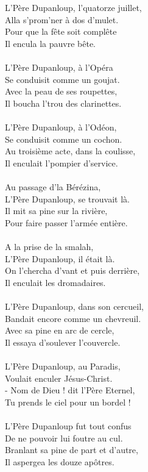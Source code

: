 \\\\L'Père Dupanloup, l'quatorze juillet, \bissimple
\\Alla s'prom'ner à dos d'mulet. \bissimple
\\Pour que la fête soit complête
\\Il encula la pauvre bête.
\\\\L'Père Dupanloup, à l'Opéra \bissimple
\\Se conduisit comme un goujat. \bissimple
\\Avec la peau de ses roupettes,
\\Il boucha l'trou des clarinettes.
\\\\L'Père Dupanloup, à l'Odéon, \bissimple
\\Se conduisit comme un cochon. \bissimple
\\Au troisième acte, dans la coulisse,
\\Il enculait l'pompier d'service.
\\\\Au passage d'la Bérézina, \bissimple
\\L'Père Dupanloup, se trouvait là. \bissimple
\\Il mit sa pine sur la rivière,
\\Pour faire passer l'armée entière.
\\\\A la prise de la smalah, \bissimple
\\L'Père Dupanloup, il était là. \bissimple
\\On l'chercha d'vant et puis derrière,
\\Il enculait les dromadaires.
\\\\L'Père Dupanloup, dans son cercueil, \bissimple
\\Bandait encore comme un chevreuil. \bissimple
\\Avec sa pine en arc de cercle,
\\Il essaya d'soulever l'couvercle.
\\\\L'Père Dupanloup, au Paradis, \bissimple
\\Voulait enculer Jésus-Christ. \bissimple
\\- Nom de Dieu ! dit l'Père Eternel,
\\Tu prends le ciel pour un bordel !
\\\\L'Père Dupanloup fut tout confus \bissimple
\\De ne pouvoir lui foutre au cul. \bissimple
\\Branlant sa pine de part et d'autre,
\\Il aspergea les douze apôtres.


\breakpage